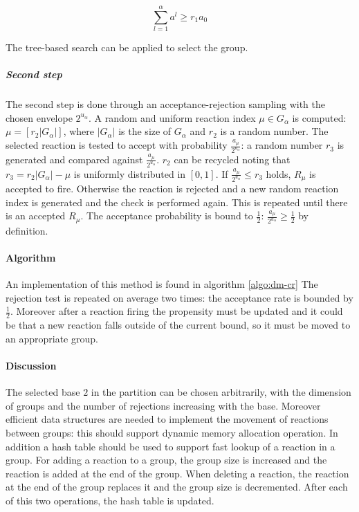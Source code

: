         $$\sum\limits_{l=1}^\alpha a^l\ge r_1a_0$$

        The tree-based search can be applied to select the group.

        \subparagraph{Second step}
        The second step is done through an acceptance-rejection sampling with the chosen envelope $2^{u_\alpha}$.
        A random and uniform reaction index $\mu\in G_\alpha$ is computed: $\mu = [r_2|G_\alpha|]$, where $|G_\alpha|$ is the size of $G_\alpha$ and $r_2$ is a random number.
        The selected reaction is tested to accept with probability $\frac{a_\mu}{2^{u_\alpha}}$: a random number $r_3$ is generated and compared against $\frac{a_\mu}{2^{u_\alpha}}$.
        $r_2$ can be recycled noting that $r_3 = r_2|G_\alpha|-\mu$ is uniformly distributed in $[0,1]$.
        If $\frac{a_\mu}{2^{u_\alpha}}\le r_3$ holds, $R_\mu$ is accepted to fire.
        Otherwise the reaction is rejected and a new random reaction index is generated and the check is performed again.
        This is repeated until there is an accepted $R_\mu$.
        The acceptance probability is bound to $\frac{1}{2}$: $\frac{a_\mu}{2^{u_\alpha}}\ge \frac{1}{2}$ by definition.

      \paragraph{Algorithm}
      An implementation of this method is found in algorithm \ref{algo:dm-cr}
      The rejection test is repeated on average two times: the acceptance rate is bounded by $\frac{1}{2}$.
      Moreover after a reaction firing the propensity must be updated and it could be that a new reaction falls outside of the current bound, so it must be moved to an appropriate group.

      

      \paragraph{Discussion}
      The selected base $2$ in the partition can be chosen arbitrarily, with the dimension of groups and the number of rejections increasing with the base.
      Moreover efficient data structures are needed to implement the movement of reactions between groups: this should support dynamic memory allocation operation.
      In addition a hash table should be used to support fast lookup of a reaction in a group.
      For adding a reaction to a group, the group size is increased and the reaction is added at the end of the group.
      When deleting a reaction, the reaction at the end of the group replaces it and the group size is decremented.
      After each of this two operations, the hash table is updated.

